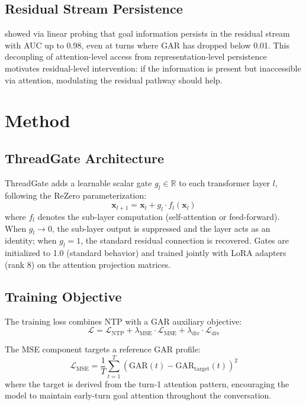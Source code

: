 \documentclass[11pt,a4paper]{article}
\begin{document}
\subsection{Residual Stream Persistence}

\citet{dongre2026multiturn} showed via linear probing that goal information persists in the residual stream with AUC up to 0.98, even at turns where GAR has dropped below 0.01.
This decoupling of attention-level access from representation-level persistence motivates residual-level intervention: if the information is present but inaccessible via attention, modulating the residual pathway should help.

\section{Method}
\label{sec:method}

\subsection{ThreadGate Architecture}

ThreadGate adds a learnable scalar gate $g_l \in \mathbb{R}$ to each transformer layer $l$, following the ReZero parameterization:
\begin{equation}
    \mathbf{x}_{l+1} = \mathbf{x}_l + g_l \cdot f_l(\mathbf{x}_l)
    \label{eq:threadgate}
\end{equation}
where $f_l$ denotes the sub-layer computation (self-attention or feed-forward).
When $g_l \to 0$, the sub-layer output is suppressed and the layer acts as an identity; when $g_l = 1$, the standard residual connection is recovered.
Gates are initialized to 1.0 (standard behavior) and trained jointly with LoRA adapters (rank 8) on the attention projection matrices.

\subsection{Training Objective}

The training loss combines NTP with a GAR auxiliary objective:
\begin{equation}
    \mathcal{L} = \mathcal{L}_{\text{NTP}} + \lambda_{\text{MSE}} \cdot \mathcal{L}_{\text{MSE}} + \lambda_{\text{div}} \cdot \mathcal{L}_{\text{div}}
\end{equation}

The MSE component targets a reference GAR profile:
\begin{equation}
    \mathcal{L}_{\text{MSE}} = \frac{1}{T}\sum_{t=1}^{T} \left(\text{GAR}(t) - \text{GAR}_{\text{target}}(t)\right)^2
\end{equation}
where the target is derived from the turn-1 attention pattern, encouraging the model to maintain early-turn goal attention throughout the conversation.
\end{document}
